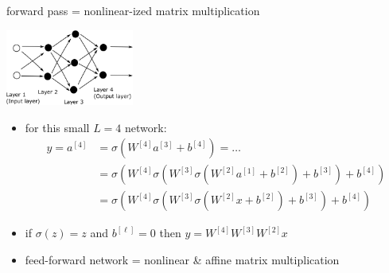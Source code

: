 \documentclass[xcolor={svgnames},
               hyperref={colorlinks,citecolor=DeepPink4,linkcolor=FireBrick,urlcolor=Maroon}]
               {beamer}
\begin{document}
\begin{frame}{forward pass = nonlinear-ized matrix multiplication}

\begin{center}
\includegraphics[height=25mm]{figs/network}
\end{center}

\begin{itemize}
\item for this small $L=4$ network:
\begin{align*}
y = a^{[4]} &= \sigma\left(W^{[4]} a^{[3]} + b^{[4]}\right) = \dots \\
            &= \sigma\left(W^{[4]} \sigma\left(W^{[3]} \sigma\left(W^{[2]} a^{[1]} + b^{[2]}\right) + b^{[3]}\right) + b^{[4]}\right) \\
            &= \sigma\left(W^{[4]} \sigma\left(W^{[3]} \sigma\left(W^{[2]} x + b^{[2]}\right) + b^{[3]}\right) + b^{[4]}\right)
\end{align*}
\item if $\sigma(z)=z$ and $b^{[\ell]}=0$ then $y = W^{[4]} W^{[3]} W^{[2]} x$
\item feed-forward network = nonlinear \& affine matrix multiplication
\end{itemize}
\end{frame}
\end{document}

